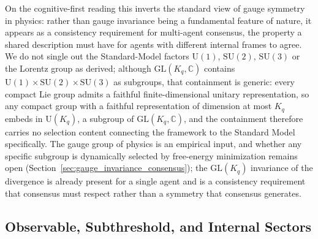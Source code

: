 \documentclass[11pt]{article}
\begin{document}
On the cognitive-first reading this inverts the standard view of gauge symmetry in physics: rather than gauge invariance being a fundamental feature of nature, it appears as a consistency requirement for multi-agent consensus, the property a shared description must have for agents with different internal frames to agree. We do not single out the Standard-Model factors $\mathrm{U}(1)$, $\mathrm{SU}(2)$, $\mathrm{SU}(3)$ or the Lorentz group as derived; although $\mathrm{GL}(K_q, \mathbb{C})$ contains $\mathrm{U}(1) \times \mathrm{SU}(2) \times \mathrm{SU}(3)$ as subgroups, that containment is generic: every compact Lie group admits a faithful finite-dimensional unitary representation, so any compact group with a faithful representation of dimension at most $K_q$ embeds in $\mathrm{U}(K_q)$, a subgroup of $\mathrm{GL}(K_q, \mathbb{C})$, and the containment therefore carries no selection content connecting the framework to the Standard Model specifically. The gauge group of physics is an empirical input, and whether any specific subgroup is dynamically selected by free-energy minimization remains open (Section~\ref{sec:gauge_invariance_consensus}); the $\mathrm{GL}(K_q)$ invariance of the divergence is already present for a single agent and is a consistency requirement that consensus must respect rather than a symmetry that consensus generates.

\subsection{Observable, Subthreshold, and Internal Sectors}
\label{sec:observable_sectors}
\end{document}
